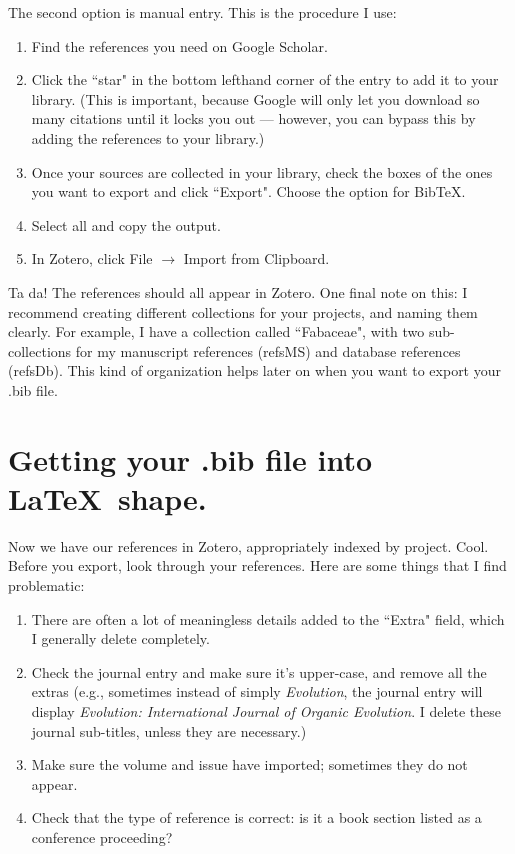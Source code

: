 \documentclass[11pt]{article}
\begin{document}
The second option is manual entry. This is the procedure I use:
\begin{enumerate}
\item{Find the references you need on Google Scholar.}
\item{Click the ``star" in the bottom lefthand corner of the entry to add it to your library. (This is important, because Google will only let you download so many citations until it locks you out --- however, you can bypass this by adding the references to your library.)}
\item{Once your sources are collected in your library, check the boxes of the ones you want to export and click ``Export". Choose the option for Bib\TeX.}
\item{Select all and copy the output.}
\item{In Zotero, click File $\rightarrow$ Import from Clipboard.}
\end{enumerate}

Ta da! The references should all appear in Zotero. One final note on this: I recommend creating different collections for your projects, and naming them clearly. For example, I have a collection called ``Fabaceae", with two sub-collections for my manuscript references (refsMS) and database references (refsDb). This kind of organization helps later on when you want to export your .bib file.\\

\section{Getting your .bib file into \LaTeX\ shape.}

Now we have our references in Zotero, appropriately indexed by project. Cool. Before you export, look through your references. Here are some things that I find problematic:

\begin{enumerate}
\item{There are often a lot of meaningless details added to the ``Extra" field, which I generally delete completely.}
\item{Check the journal entry and make sure it's upper-case, and remove all the extras (e.g., sometimes instead of simply \textit{Evolution}, the journal entry will display \textit{Evolution: International Journal of Organic Evolution}. I delete these journal sub-titles, unless they are necessary.)}
\item{Make sure the volume and issue have imported; sometimes they do not appear.}
\item{Check that the type of reference is correct: is it a book section listed as a conference proceeding?}
\end{enumerate}
\end{document}
